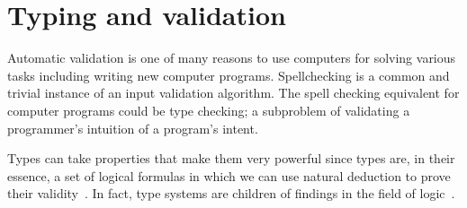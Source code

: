 \documentclass[11pt,oneside,a4paper]{report}
\begin{document}
\chapter{Typing and validation}
Automatic validation is one of many reasons to use computers for solving various tasks including writing new computer programs.
Spellchecking is a common and trivial instance of an input validation algorithm. 
The spell checking equivalent for computer programs could be type checking; a subproblem of validating a programmer's intuition of a program's intent.

Types can take properties that make them very powerful since types are, in their essence, a set of logical formulas in which we can use natural deduction to prove their validity~\cite{howard1980formulae}.
In fact, type systems are children of findings in the field of logic~\cite{wadler2015propositions}.
\clearpage


\end{document}
